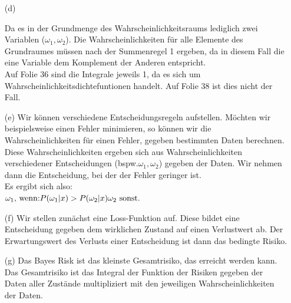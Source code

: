 \documentclass[a4paper]{scrartcl}
\begin{document}
\begin{itemize}
\item[(d)]


Da es in der Grundmenge des Wahrscheinlichkeitsraums lediglich zwei Variablen ($\omega_1, \omega_2$). Die Wahrscheinlichkeiten für alle Elemente des Grundraumes müssen nach der Summenregel 1 ergeben, da 
in diesem Fall die eine Variable dem Komplement der Anderen entspricht.
\\
Auf Folie 36 sind die Integrale jeweils 1, da es sich um Wahrscheinlichkeitsdichtefuntionen handelt. Auf Folie 38 ist dies nicht der Fall.


\item[(e)] Wir können verschiedene Entscheidungsregeln aufstellen. Möchten wir beispielsweise einen Fehler minimieren, so können wir die Wahrscheinlichkeiten für einen Fehler, gegeben bestimmten Daten berechnen.\\
Diese Wahrscheinlichkeiten ergeben sich aus Wahrscheinlichkeiten verschiedener Entscheidungen (bspw.$\omega_1, \omega_2$) gegeben der Daten. Wir nehmen dann die Entscheidung, bei der der Fehler geringer ist.\\
Es ergibt sich also:\\
$
\omega_1 \text{, wenn:} P(\omega_1|x) > P(\omega_2|x)\\
\omega_2 \text{ sonst.}
$\\

\item[(f)] Wir stellen zunächst eine Loss-Funktion auf. Diese bildet eine Entscheidung gegeben dem wirklichen Zustand auf einen Verlustwert ab. Der Erwartungswert des Verlusts einer Entscheidung ist dann das bedingte Risiko.



\item[(g)] Das Bayes Risk ist das kleinste Gesamtrisiko, das erreicht werden kann. Das Gesamtrisiko ist das Integral der Funktion der Risiken gegeben der Daten aller Zustände multipliziert mit den jeweiligen Wahrscheinlichkeiten der Daten.




\end{itemize}
\end{document}
